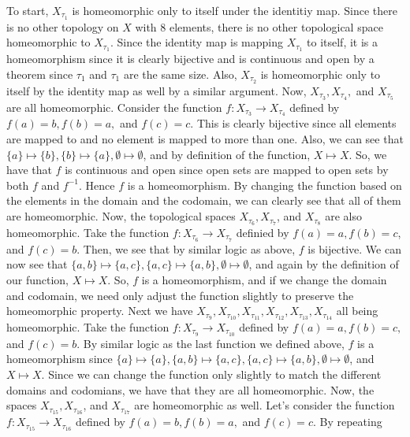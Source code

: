 \begin{solution}
    To start, $X_{\tau_1}$ is homeomorphic only to itself under the identitiy map. Since there is no
    other topology on $X$ with 8 elements, there is no other topological space homeomorphic to
    $X_{\tau_1}$. Since the identity map is mapping $X_{\tau_1}$ to itself, it is a homeomorphism since
    it is clearly bijective and is continuous and open by a theorem since $\tau_1$ and $\tau_1$ are the
    same size. Also, $X_{\tau_2}$ is homeomorphic only to itself by the identity map as well by a
    similar argument. Now, $X_{\tau_3}, X_{\tau_4},$ and $X_{\tau_5}$ are all homeomorphic. Consider the
    function $f:X_{\tau_3}\rightarrow X_{\tau_4}$ defined by $f(a)=b, f(b)=a,$ and $f(c)=c$. This is
    clearly bijective since all elements are mapped to and no element is mapped to more than one. Also,
    we can see that $\{a\}\mapsto\{b\}, \{b\}\mapsto\{a\}, \emptyset\mapsto\emptyset$, and by definition
    of the function, $X\mapsto X$. So, we have that $f$ is continuous and open since open sets are
    mapped to open sets by both $f$ and $f^{-1}$. Hence $f$ is a homeomorphism. By changing the function
    based on the elements in the domain and the codomain, we can clearly see that all of them are
    homeomorphic. Now, the topological spaces $X_{\tau_6}, X_{\tau_7}$, and $X_{\tau_8}$ are also
    homeomorphic. Take the function $f:X_{\tau_6}\rightarrow X_{\tau_7}$ definied by $f(a)=a, f(b)=c$,
    and $f(c)=b$. Then, we see that by similar logic as above, $f$ is bijective. We can now see that
    $\{a,b\}\mapsto\{a,c\}, \{a,c\}\mapsto\{a,b\}, \emptyset\mapsto\emptyset$, and again by the
    definition of our function, $X\mapsto X$. So, $f$ is a homeomorphism, and if we change the domain
    and codomain, we need only adjust the function slightly to preserve the homeomorphic property. Next
    we have $X_{\tau_9}, X_{\tau_{10}}, X_{\tau_{11}}, X_{\tau_{12}}, X_{\tau_{13}}, X_{\tau_{14}}$ all
    being homeomorphic. Take the function $f:X_{\tau_9}\rightarrow X_{\tau_{10}}$ defined by
    $f(a)=a, f(b)=c,$ and $f(c)=b$. By similar logic as the last function we defined above, $f$ is a
    homeomorphism since
    $\{a\}\mapsto\{a\}, \{a,b\}\mapsto\{a,c\}, \{a,c\}\mapsto\{a,b\}, \emptyset\mapsto\emptyset$, and
    $X\mapsto X$. Since we can change the function only slightly to match the different domains and
    codomians, we have that they are all homeomorphic. Now, the spaces $X_{\tau_{15}}, X_{\tau_{16}}$,
    and $X_{\tau_{17}}$ are homeomorphic as well. Let's consider the function
    $f:X_{\tau_{15}}\rightarrow X_{\tau_{16}}$ defined by $f(a)=b, f(b)=a,$ and $f(c)=c$. By repeating

\end{solution}
